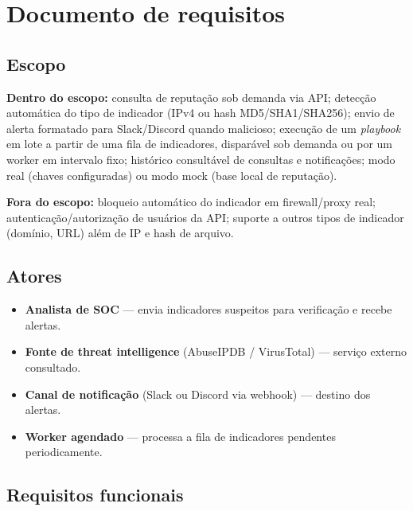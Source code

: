 \documentclass[11pt,a4paper]{article}
\begin{document}
\section{Documento de requisitos}

\subsection{Escopo}

\textbf{Dentro do escopo:} consulta de reputação sob demanda via API; detecção
automática do tipo de indicador (IPv4 ou hash MD5/SHA1/SHA256); envio de alerta
formatado para Slack/Discord quando malicioso; execução de um \emph{playbook} em lote
a partir de uma fila de indicadores, disparável sob demanda ou por um worker em
intervalo fixo; histórico consultável de consultas e notificações; modo real (chaves
configuradas) ou modo mock (base local de reputação).

\textbf{Fora do escopo:} bloqueio automático do indicador em firewall/proxy real;
autenticação/autorização de usuários da API; suporte a outros tipos de indicador
(domínio, URL) além de IP e hash de arquivo.

\subsection{Atores}

\begin{itemize}[nosep]
  \item \textbf{Analista de SOC} --- envia indicadores suspeitos para verificação e
  recebe alertas.
  \item \textbf{Fonte de threat intelligence} (AbuseIPDB / VirusTotal) --- serviço
  externo consultado.
  \item \textbf{Canal de notificação} (Slack ou Discord via webhook) --- destino dos
  alertas.
  \item \textbf{Worker agendado} --- processa a fila de indicadores pendentes
  periodicamente.
\end{itemize}

\subsection{Requisitos funcionais}
\end{document}
